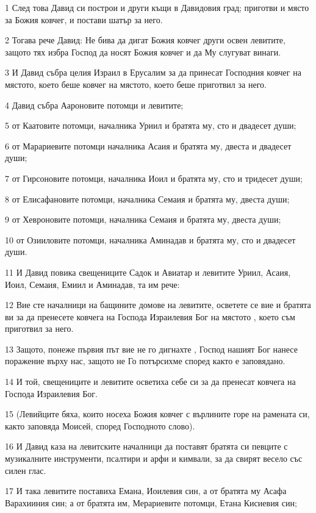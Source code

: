 \par 1 След това Давид си построи и други къщи в Давидовия град; приготви и място за Божия ковчег, и постави шатър за него.
\par 2 Тогава рече Давид: Не бива да дигат Божия ковчег други освен левитите, защото тях избра Господ да носят Божия ковчег и да Му слугуват винаги.
\par 3 И Давид събра целия Израил в Ерусалим за да принесат Господния ковчег на мястото, което беше ковчег на мястото, което беше приготвил за него.
\par 4 Давид събра Аароновите потомци и левитите;
\par 5 от Каатовите потомци, началника Уриил и братята му, сто и двадесет души;
\par 6 от Марариевите потомци началника Асаия и братята му, двеста и двадесет души;
\par 7 от Гирсоновите потомци, началника Иоил и братята му, сто и тридесет души;
\par 8 от Елисафановите потомци, началника Семаия и братята му, двеста души;
\par 9 от Хевроновите потомци, началника Семаия и братята му, двеста души;
\par 10 от Озииловите потомци, началника Аминадав и братята му, сто и двадесет души.
\par 11 И Давид повика свещениците Садок и Авиатар и левитите Уриил, Асаия, Иоил, Семаия, Емиил и Аминадав, та им рече:
\par 12 Вие сте началници на бащините домове на левитите, осветете се вие и братята ви за да пренесете ковчега на Господа Израилевия Бог на мястото , което съм приготвил за него.
\par 13 Защото, понеже първия път вие не го дигнахте , Господ нашият Бог нанесе поражение върху нас, защото не Го потърсихме според както е заповядано.
\par 14 И той, свещениците и левитите осветиха себе си за да пренесат ковчега на Господа Израилевия Бог.
\par 15 (Левийците бяха, които носеха Божия ковчег с върлините горе на рамената си, както заповяда Моисей, според Господното слово).
\par 16 И Давид каза на левитските началници да поставят братята си певците с музикалните инструменти, псалтири и арфи и кимвали, за да свирят весело със силен глас.
\par 17 И така левитите поставиха Емана, Иоилевия син, а от братята му Асафа Варахииния син; а от братята им, Мерариевите потомци, Етана Кисиевия син;
